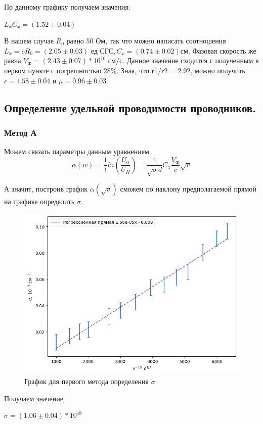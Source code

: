 \documentclass[a4paper,12pt]{article} %
\begin{document}
По данному графику получаем значения:

\begin{center}
    $L_xC_x = (1.52 \pm 0.04)$
\end{center}

В нашем случае $R_0$ равно 50 Ом, так что можно написать соотношения $L_x = cR_0 = (2.05 \pm 0.03) \text{ ед СГС}, C_x = (0.74 \pm 0.02) см$. Фазовая скорость же равна $V_\text{Ф} = (2.43\pm0.07) * 10^{10}$ см/с. Данное значение сходится с полученным в первом пункте с погрешностью 28\%. Зная, что r1/r2 = 2.92, можно получить $\epsilon = 1.58 \pm 0.04 \text{ и } \mu = 0.96 \pm 0.03$

\subsection{Определение удельной проводимости проводников.}
\subsubsection{Метод А}
Можем связать параметры данным уравнением
\begin{equation}
    \alpha(w) = \frac{1}{l}ln(\frac{U_0}{U_H}) = \frac{4}{\sqrt{\sigma} d} C_x\frac{V_\text{Ф}}{c}\sqrt{v}
\end{equation}

А значит, построив график $\alpha(\sqrt{v})$ сможем по наклону предполагаемой прямой на графике определить $\sigma$.

\begin{figure}[H]
    \centering
    \includegraphics[width=0.7\linewidth]{plot/fig4.png}
    \caption{График для первого метода определения $\sigma$}
\end{figure}

Получаем значение
\begin{center}
    $\sigma = (1.06 \pm 0.04) * 10^{18}$
\end{center}
\end{document}
